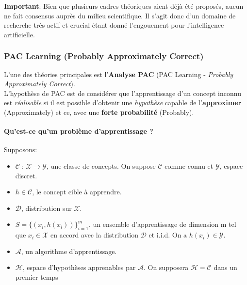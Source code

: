 \noindent \textbf{Important}: Bien que plusieurs cadres théoriques aient déjà été proposés, aucun ne fait consensus auprès du milieu scientifique. Il s'agit donc d'un domaine de recherche très actif et crucial étant donné l'engouement pour l'intelligence artificielle.\\

\subsubsection{PAC Learning (Probably Approximately Correct)}

\noindent L'une des théories principales est l'\textbf{Analyse PAC} (PAC Learning - \textit{Probably Approximately Correct})\cite{pac}.\\

\noindent L'hypothèse de PAC est de considérer que l'apprentissage d'un concept inconnu est \textit{réalisable} si il est possible d'obtenir une \textit{hypothèse} capable de l'\textbf{approximer} (Approximately) et ce, avec une \textbf{forte probabilité} (Probably).

\paragraph{Qu'est-ce qu'un problème d'apprentissage ?}

\noindent Supposons:
\begin{itemize}
    \item $\mathcal{C} \ : \ \mathcal{X} \rightarrow \mathcal{Y}$, une classe de concepts. On suppose $\mathcal{C}$ comme connu et $\mathcal{Y}$, espace discret.

    \item $h \in \mathcal{C}$, le concept cible à apprendre.

    \item $\mathcal{D}$, distribution sur $\mathcal{X}$.

    \item $S=\{(x_i,h(x_i))\}_{i=1}^m$, un ensemble d'apprentissage de dimension m tel que $x_i \in \mathcal{X}$ en accord avec la distribution $\mathcal{D}$ et i.i.d. On a $h(x_i) \in \mathcal{Y}$.

    \item $\mathcal{A}$, un algorithme d'apprentissage.

    \item $\mathcal{H}$, espace d'hypothèses apprenables par $\mathcal{A}$. On supposera $\mathcal{H}=\mathcal{C}$ dans un premier temps
\end{itemize}

